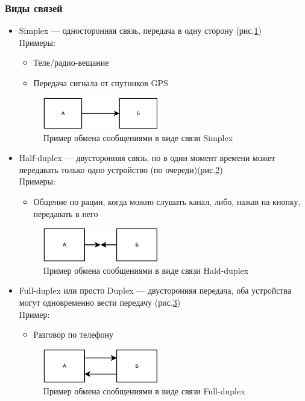 \documentclass[a4paper]{article}
\begin{document}
\subsubsection{Виды связей}
\begin{itemize}
	\item Simplex --- односторонняя связь, передача в одну сторону (рис.\ref{fig:pic-1}) \\ Примеры: 
		\begin{itemize}
			\item Теле/радио-вещание
			\item Передача сигнала от спутников GPS
		\end{itemize}
		\begin{figure}[!h]
			\centering
			\includegraphics[width=5cm]{1-simplex.png}
			\caption{Пример обмена сообщениями в виде связи Simplex}
			\label{fig:pic-1}
		\end{figure}
	\item Half-duplex --- двусторонняя связь, но в один момент времени может передавать только одно устройство (по очереди)(рис.\ref{fig:pic-2}) \\ Примеры:
		\begin{itemize}
			\item Общение по рации, когда можно слушать канал, либо, нажав на кнопку, передавать в него
		\end{itemize}
		\begin{figure}[!h]
			\centering
			\includegraphics[width=5cm]{2-half-duplex.png}
			\caption{Пример обмена сообщениями в виде связи Hald-duplex}
			\label{fig:pic-2}
		\end{figure}
	\item Full-duplex или просто Duplex --- двусторонняя передача, оба устройства могут одновременно вести передачу (рис.\ref{fig:pic-3}) \\ Пример:
		\begin{itemize}
			\item Разговор по телефону
		\end{itemize}
		\begin{figure}[!h]
			\centering
			\includegraphics[width=5cm]{3-full-duplex.png}
			\caption{Пример обмена сообщениями в виде связи Full-duplex}
			\label{fig:pic-3}
		\end{figure}
\end{itemize}
\end{document}
